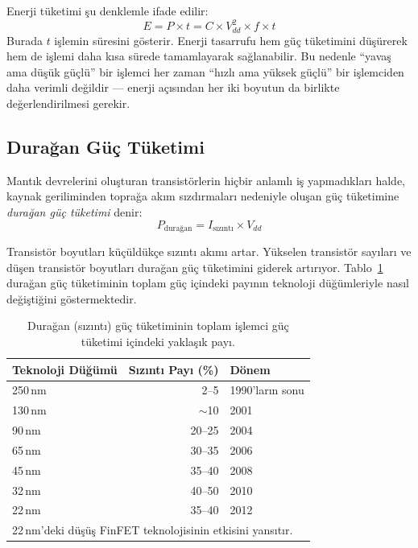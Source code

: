 Enerji tüketimi şu denklemle ifade edilir:
\begin{equation}
E = P \times t = C \times V_{dd}^2 \times f \times t
\label{eq:enerji}
\end{equation}
Burada $t$ işlemin süresini gösterir. Enerji tasarrufu hem güç tüketimini düşürerek hem de işlemi daha kısa sürede tamamlayarak sağlanabilir. Bu nedenle ``yavaş ama düşük güçlü'' bir işlemci her zaman ``hızlı ama yüksek güçlü'' bir işlemciden daha verimli değildir --- enerji açısından her iki boyutun da birlikte değerlendirilmesi gerekir.


\subsection{Durağan Güç Tüketimi}
\label{sec:duragan-guc}

Mantık devrelerini oluşturan transistörlerin hiçbir anlamlı iş yapmadıkları halde, kaynak geriliminden toprağa akım sızdırmaları nedeniyle oluşan güç tüketimine \emph{durağan güç tüketimi} denir:
\begin{equation}
P_{\text{durağan}} = I_{\text{sızıntı}} \times V_{dd}
\label{eq:duragan-guc}
\end{equation}

Transistör boyutları küçüldükçe sızıntı akımı artar. Yükselen transistör sayıları ve düşen transistör boyutları durağan güç tüketimini giderek artırıyor. Tablo~\ref{tab:sizinti-trend} durağan güç tüketiminin toplam güç içindeki payının teknoloji düğümleriyle nasıl değiştiğini göstermektedir.

\begin{table}[ht!]
\centering
\caption[Durağan güç oranının teknoloji düğümlerine göre değişimi]{Durağan (sızıntı) güç tüketiminin toplam işlemci güç tüketimi içindeki yaklaşık payı.}
\label{tab:sizinti-trend}
\footnotesize
\begin{tabular}{lrl}
\toprule
\textbf{Teknoloji Düğümü} & \textbf{Sızıntı Payı (\%)} & \textbf{Dönem} \\
\midrule
250\,nm  & 2--5    & 1990'ların sonu \\
130\,nm  & ${\sim}$10   & 2001 \\
90\,nm   & 20--25  & 2004 \\
65\,nm   & 30--35  & 2006 \\
45\,nm   & 35--40  & 2008 \\
32\,nm   & 40--50  & 2010 \\
22\,nm   & 35--40  & 2012 \\
\bottomrule
\multicolumn{3}{l}{\scriptsize 22\,nm'deki düşüş FinFET teknolojisinin etkisini yansıtır.}
\end{tabular}
\end{table}

